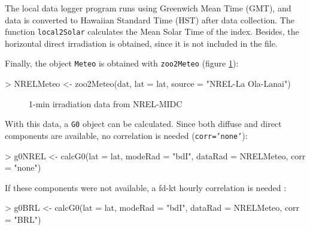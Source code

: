 \documentclass[a4paper]{article}
\renewenvironment{Schunk}{\vspace{\topsep}}{\vspace{\topsep}}
\newcommand{\code}[1]{{\texttt{#1}}}
\begin{document}
The local data logger program runs using Greenwich Mean Time (GMT), and
data is converted to Hawaiian Standard Time (HST) after data
collection. The function \code{local2Solar} calculates the Mean Solar
Time of the index. Besides, the horizontal direct irradiation is
obtained, since it is not included in the file.

\begin{Schunk}
\end{Schunk}

Finally, the  object \code{Meteo} is obtained with \code{zoo2Meteo} (figure \ref{fig:NREL-MIDC}):

\begin{Schunk}
\begin{Sinput}
> NRELMeteo <- zoo2Meteo(dat, lat = lat, source = "NREL-La Ola-Lanai")
\end{Sinput}
\end{Schunk}

\begin{figure}
  \centering
  \caption{1-min irradiation data from NREL-MIDC}
  \label{fig:NREL-MIDC}
\end{figure}

With this data, a \code{G0} object can be calculated. Since both
diffuse and direct components are available, no correlation is needed (\code{corr='none'}):

\begin{Schunk}
\begin{Sinput}
> g0NREL <- calcG0(lat = lat, modeRad = "bdI", dataRad = NRELMeteo, 
     corr = "none")
\end{Sinput}
\end{Schunk}

If these components were not available, a fd-kt hourly correlation is
needed \cite{Ridley.Boland.ea2010}:

\begin{Schunk}
\begin{Sinput}
> g0BRL <- calcG0(lat = lat, modeRad = "bdI", dataRad = NRELMeteo, 
     corr = "BRL")
\end{Sinput}
\end{Schunk}
\end{document}
